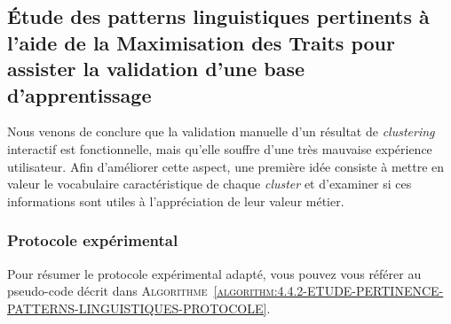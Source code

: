 	
	\subsection{Étude des patterns linguistiques pertinents à l'aide de la Maximisation des Traits pour assister la validation d'une base d'apprentissage}
	\label{section:4.4.2-ETUDE-PERTINENCE-PATTERNS-LINGUISTIQUES}
		
		Nous venons de conclure que la validation manuelle d'un résultat de \textit{clustering} interactif est fonctionnelle, mais qu'elle souffre d'une très mauvaise expérience utilisateur.
		Afin d'améliorer cette aspect, une première idée consiste à mettre en valeur le vocabulaire caractéristique de chaque \textit{cluster} et d'examiner si ces informations sont utiles à l'appréciation de leur valeur métier.
	
		\subsubsection{Protocole expérimental}
			
			Pour résumer le protocole expérimental adapté, vous pouvez vous référer au pseudo-code décrit dans \textsc{Algorithme~\ref{algorithm:4.4.2-ETUDE-PERTINENCE-PATTERNS-LINGUISTIQUES-PROTOCOLE}}.
			
